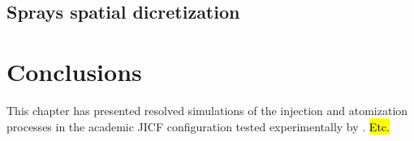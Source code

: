 \subsection{Sprays spatial dicretization}
\label{subsec:ch5_learning_SLI}







\section{Conclusions}

This chapter has presented resolved simulations of the injection and atomization processes in the academic JICF configuration tested experimentally by . \hl{Etc.}